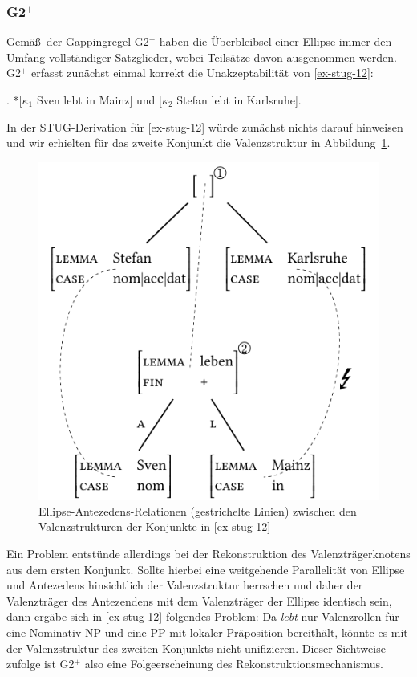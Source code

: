\subsubsection*{G2$^+$} \label{sec-stug-g2}

Gemä\ss\ der Gappingregel G2$^+$ haben die Überbleibsel einer Ellipse immer den Umfang vollständiger Satzglieder, wobei Teilsätze davon ausgenommen werden. G2$^+$ erfasst zunächst einmal korrekt die Unakzeptabilität von \ref{ex-stug-12}: 

\ex. \label{ex-stug-12} *[$\kappa_1$ Sven lebt in Mainz] und [$\kappa_2$ Stefan \sout{lebt in} Karlsruhe]. 

In der STUG-Derivation für \ref{ex-stug-12} würde zunächst nichts darauf hinweisen und wir erhielten für das zweite Konjunkt die Valenzstruktur in Abbildung~\ref{fig-stug-16}. 
\begin{figure}[t]
\centering
\includegraphics{graphics/abb916.pdf}
\caption{\label{fig-stug-16}Ellipse-Antezedens-Relationen (gestrichelte Linien) zwischen den Valenzstrukturen der Konjunkte in \ref{ex-stug-12}}
\end{figure}
Ein Problem entstünde allerdings bei der Rekonstruktion des Valenzträgerknotens aus dem ersten Konjunkt. Sollte hierbei eine weitgehende Parallelität von Ellipse und Antezedens hinsichtlich der Valenzstruktur herrschen und daher der Valenzträger des Antezendens mit dem Valenzträger der Ellipse identisch sein, dann ergäbe sich in \ref{ex-stug-12} folgendes Problem: Da {\it lebt} nur Valenzrollen für eine Nominativ-NP und eine PP mit lokaler Präposition bereithält, könnte es mit der Valenzstruktur des zweiten Konjunkts nicht unifizieren. Dieser Sichtweise zufolge ist G2$^+$ also eine Folgeerscheinung des Rekonstruktionsmechanismus.  


